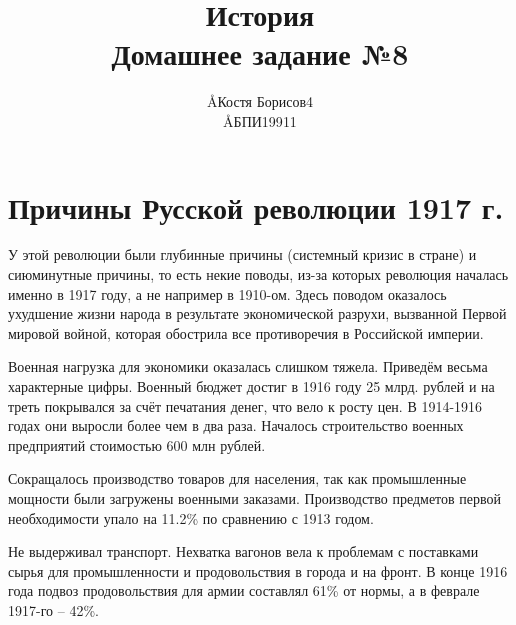 \documentclass[12pt]{article}
\title{История \\ Домашнее задание №8}
\author{\AA{Костя Борисов}{4} \\ \AA{БПИ199}{11}}
\newcommand{\orange}[1]{{\color{orange}{#1}}}
\begin{document}
  \maketitle

  \setcounter{section}{2}
  \section{Причины Русской революции 1917 г.}

  У этой революции были глубинные причины (системный кризис в стране) и сиюминутные причины,
  то есть некие поводы, из-за которых революция началась именно в 1917 году, а не например в 1910-ом.
  Здесь поводом оказалось ухудшение жизни народа в результате экономической разрухи,
  вызванной Первой мировой войной, которая обострила все противоречия в Российской империи.

  Военная нагрузка для экономики оказалась слишком тяжела.
  Приведём весьма характерные цифры.
  Военный бюджет достиг в 1916 году 25 млрд. рублей и на треть покрывался за счёт печатания денег, что вело к росту цен.
  В 1914-1916 годах они выросли более чем в два раза.
  Началось строительство военных предприятий стоимостью 600 млн рублей.

  Сокращалось производство товаров для населения, так как промышленные мощности были загружены военными заказами.
  Производство предметов первой необходимости упало на 11.2\% по сравнению с 1913 годом.

  Не выдерживал транспорт.
  Нехватка вагонов вела к проблемам с поставками сырья для промышленности и продовольствия в города и на фронт.
  В конце 1916 года подвоз продовольствия для армии составлял 61\% от нормы, а в феврале 1917-го -- 42\%.

\end{document}
